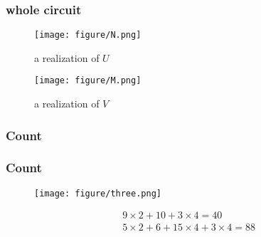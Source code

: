 \begin{frame}
  \frametitle{whole circuit}
  \begin{figure}
    \texttt{[image: figure/N.png]}
    \caption{a realization of $U$}
  \end{figure}
  \begin{figure}
    \texttt{[image: figure/M.png]}
    \caption{a realization of $V$}
  \end{figure}
\end{frame}
\subsubsection{Count}
\begin{frame}
\frametitle{Count}
  \begin{figure}
    \texttt{[image: figure/three.png]}
  \end{figure}
  \begin{align}
    &9\times 2+10 +3\times 4=40\\
    &5\times 2 +6+ 15\times4+3\times 4=88
  \end{align}
\end{frame}
